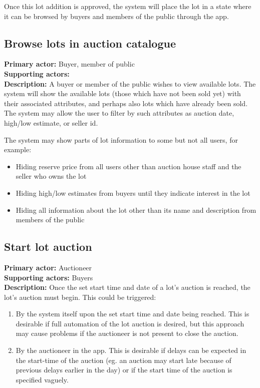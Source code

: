 \documentclass[titlepage, 12pt]{extarticle}
\begin{document}
Once this lot addition is approved, the system will place the lot in a state where it can be browsed by buyers and members of the public through the app.

\subsection{Browse lots in auction catalogue}
{\bf Primary actor: } Buyer, member of public
\\{\bf Supporting actors: }
\\{\bf Description: } A buyer or member of the public wishes to view available lots. The system will show the available lots (those which have not been sold yet) with their associated attributes, and perhaps also lots which have already been sold. The system may allow the user to filter by such attributes as auction date, high/low estimate, or seller id. 

The system may show parts of lot information to some but not all users, for example:
\begin{itemize}
  \item Hiding reserve price from all users other than auction house staff and the seller who owns the lot
  \item Hiding high/low estimates from buyers until they indicate interest in the lot
  \item Hiding all information about the lot other than its name and description from members of the public
\end{itemize}
\subsection{Start lot auction}
{\bf Primary actor: } Auctioneer
\\{\bf Supporting actors: } Buyers
\\{\bf Description: } Once the set start time and date of a lot's auction is reached, the lot's auction must begin. This could be triggered:
\begin{enumerate}
\item By the system itself upon the set start time and date being reached. This is desirable if full automation of the lot auction is desired, but this approach may cause problems if the auctioneer is not present to close the auction. 
\item By the auctioneer in the app. This is desirable if delays can be expected in the start-time of the auction (eg. an auction may start late because of previous delays earlier in the day) or if the start time of the auction is specified vaguely. 
\end{enumerate}
\end{document}
